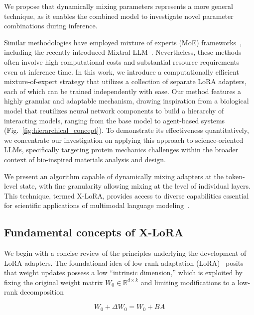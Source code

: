 We propose that dynamically mixing parameters represents a more general technique, as it enables the combined model to investigate novel parameter combinations during inference.

Similar methodologies have employed mixture of experts (MoE) frameworks~\cite{Jacobs1991AdaptiveExperts,Hampshire1992TheRecognition,Jordan1994HierarchicalAlgorithm}, including the recently introduced Mixtral LLM~\cite{Jiang2024MixtralExperts}. Nevertheless, these methods often involve high computational costs and substantial resource requirements even at inference time. In this work, we introduce a computationally efficient mixture-of-expert strategy that utilizes a collection of separate LoRA adapters, each of which can be trained independently with ease. Our method features a highly granular and adaptable mechanism, drawing inspiration from a biological model that reutilizes neural network components to build a hierarchy of interacting models, ranging from the base model to agent-based systems (Fig.~\ref{fig:hierarchical_concept}). To demonstrate its effectiveness quantitatively, we concentrate our investigation on applying this approach to science-oriented LLMs, specifically targeting protein mechanics challenges within the broader context of bio-inspired materials analysis and design.

We present an algorithm capable of dynamically mixing adapters at the token-level state, with fine granularity allowing mixing at the level of individual layers. This technique, termed X-LoRA, provides access to diverse capabilities essential for scientific applications of multimodal language modeling~\cite{Hu2023DeepScience,Buehler2023AMetamaterials,Buehler2022ProteinNetworks,}.

\subsection{Fundamental concepts of X-LoRA}

We begin with a concise review of the principles underlying the development of LoRA adapters. The foundational idea of low-rank adaptation (LoRA)~\cite{hu2021lora} posits that weight updates possess a low “intrinsic dimension,” which is exploited by fixing the original weight matrix $W_0 \in \mathbb{R}^{d \times k}$ and limiting modifications to a low-rank decomposition

\begin{equation}
W_0 + \Delta W_0 = W_0 + BA 
\end{equation}

